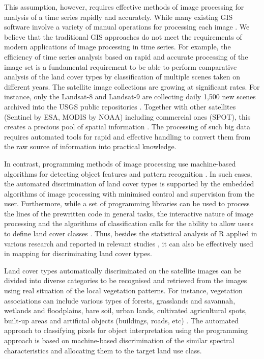 \documentclass[12pt,a4paper,oneside]{article}
\def \newpar{\vspace{6pt}}
\begin{document}
\newpar This assumption, however, requires effective methods of image processing for analysis of a time series rapidly and accurately. While many existing GIS software involve a variety of manual operations for processing each image \citep{TAPPAN200738,SPIEKERMANN2015113,EPUH2022100067}. We believe that the traditional GIS approaches do not meet the requirements of modern applications of image processing in time series. For example, the efficiency of time series analysis based on rapid and accurate processing of the image set is a fundamental requirement to be able to perform comparative analysis of the land cover types by classification of multiple scenes taken on different years. The satellite image collections are growing at significant rates. For instance, only the Landsat-8 and Landsat-9 are collecting daily 1,500 new scenes archived into the USGS public repositories \citep{USGS}. Together with other satellites (Sentinel by ESA, MODIS by NOAA) including commercial ones (SPOT), this creates a precious pool of spatial information \citep{MainiAgrawal}. The processing of such big data requires automated tools for rapid and effective handling to convert them from the raw source of information into practical knowledge. 

\newpar In contrast, programming methods of image processing use machine-based algorithms for detecting object features and pattern recognition \citep{9297369,jimaging8120317,8882177,9121731}. In such cases, the automated discrimination of land cover types is supported by the embedded algorithms of image processing with minimised control and supervision from the user. Furthermore, while a set of programming libraries can be used to process the lines of the prewritten code in general tasks, the interactive nature of image processing and the algorithms of classification calls for the ability to allow users to define land cover classes \citep{Liuetal2009}. Thus, besides the statistical analysis of R applied in various research and reported in relevant studies \citep{BIVAND20001043,Lemenkova201991,GRUNSKY20021219}, it can also be effectively used in mapping for discriminating land cover types. 

\newpar Land cover types automatically discriminated on the satellite images can be divided into diverse categories to be recognised and retrieved from the images using real situation of the local vegetation patterns. For instance, vegetation associations can include various types of forests, grasslands and savannah, wetlands and floodplains, bare soil, urban lands, cultivated agricultural spots, built-up areas and artificial objects (buildings, roads, etc) \citep{lillesand1994remote}. The automated approach to classifying pixels for object interpretation using the programming approach is based on machine-based discrimination of the similar spectral characteristics and allocating them to the target land use class.
\end{document}
